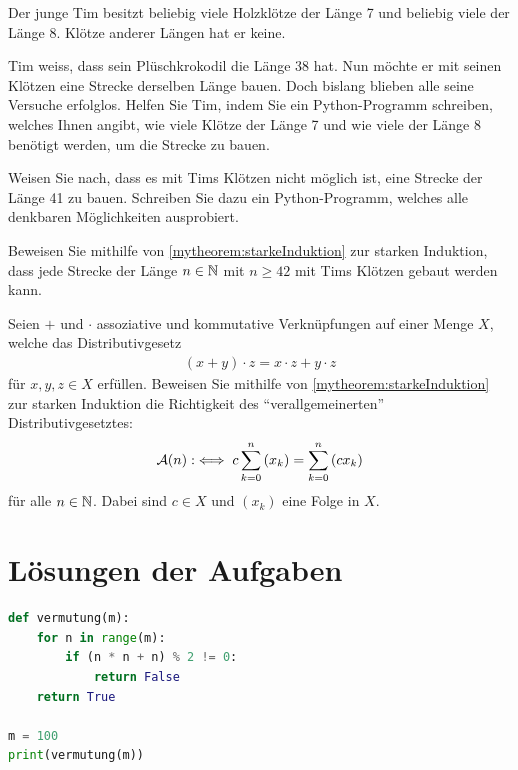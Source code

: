 \begin{myexercise}\label{myexercise:0210}
	Der junge Tim besitzt beliebig viele Holzklötze der Länge 7 und beliebig viele der Länge 8. Klötze anderer Längen hat er keine.
	\begin{aenum}
		\item Tim weiss, dass sein Plüschkrokodil die Länge 38 hat. Nun möchte er mit seinen Klötzen eine Strecke derselben Länge bauen. Doch bislang blieben alle seine Versuche erfolglos. Helfen Sie Tim, indem Sie ein Python-Programm schreiben, welches Ihnen angibt, wie viele Klötze der Länge 7 und wie viele der Länge 8 benötigt werden, um die Strecke zu bauen.
		\item Weisen Sie nach, dass es mit Tims Klötzen nicht möglich ist, eine Strecke der Länge 41 zu bauen. Schreiben Sie dazu ein Python-Programm, welches alle denkbaren Möglichkeiten ausprobiert.
		\item Beweisen Sie mithilfe von \cref{mytheorem:starkeInduktion} zur starken Induktion, dass jede Strecke der Länge $n\in\mathbb{N}$ mit $n\geq 42$ mit Tims Klötzen gebaut werden kann.
	\end{aenum}
\end{myexercise}


\begin{myexercise}\label{myexercise:0295}
	Seien $+$ und $\cdot$ assoziative und kommutative Verknüpfungen auf einer Menge $X$, welche das Distributivgesetz
	\begin{align*}
		(x+y)\cdot z = x\cdot z + y\cdot z
	\end{align*}
	für $x,y,z\in X$ erfüllen. Beweisen Sie mithilfe von \cref{mytheorem:starkeInduktion} zur starken Induktion die Richtigkeit des \enquote{verallgemeinerten} Distributivgesetztes:
	\begin{align*}
		\mathcal{A}(n) :\iff c\sum_{k=0}^n\left(x_k\right) = \sum_{k=0}^n\left(cx_k\right)
	\end{align*}
	für alle $n\in\mathbb{N}$. Dabei sind $c\in X$ und $(x_k)$ eine Folge in $X$.
\end{myexercise}

\clearpage
\section{Lösungen der Aufgaben}

\begin{myanswer}[myexercise:0200]
	\begin{lstlisting}[language=Python,caption=Vermutung überprüfen]
def vermutung(m):
    for n in range(m):
        if (n * n + n) % 2 != 0:
            return False
    return True

m = 100
print(vermutung(m))
\end{lstlisting}
\end{myanswer}

